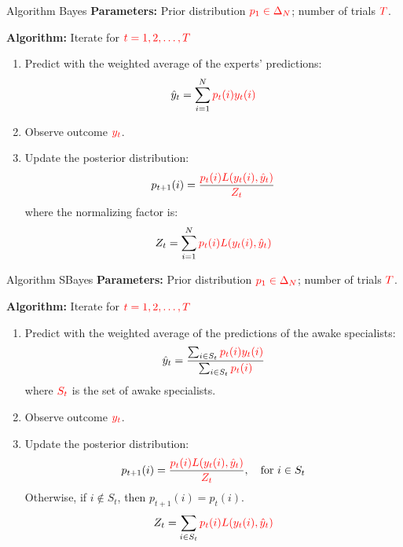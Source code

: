\documentclass{beamer}
\newcommand{\redmath}[1]{\textcolor{red}{#1}}
\begin{document}
\begin{frame}{Algorithm Bayes}
\textbf{Parameters:} Prior distribution $\redmath{p_1 \in \Delta_N}$; number of trials $\redmath{T}$.

\vspace{1em}
\textbf{Algorithm:} Iterate for $\redmath{t = 1, 2, \dots, T}$
\begin{enumerate}
    \item Predict with the weighted average of the experts' predictions:
          \[
          \hat{y}_t = \sum_{i=1}^{N} \redmath{p_t(i) y_t(i)}
          \]
    \item Observe outcome $\redmath{y_t}$.
    \item Update the posterior distribution:
          \[
          p_{t+1}(i) = \frac{\redmath{p_t(i) L(y_t(i), \hat{y}_t)}}{\redmath{Z_t}}
          \]
          where the normalizing factor is:
          \[
          Z_t = \sum_{i=1}^{N} \redmath{p_t(i) L(y_t(i), \hat{y}_t)}
          \]
\end{enumerate}
\end{frame}

\begin{frame}{Algorithm SBayes}
\textbf{Parameters:} Prior distribution $\redmath{p_1 \in \Delta_N}$; number of trials $\redmath{T}$.

\vspace{1em}
\textbf{Algorithm:} Iterate for $\redmath{t = 1, 2, \dots, T}$
\begin{enumerate}
    \item Predict with the weighted average of the predictions of the awake specialists:
          \[
          \hat{y}_t = \frac{\sum_{i \in S_t} \redmath{p_t(i) y_t(i)}}{\sum_{i \in S_t} \redmath{p_t(i)}}
          \]
          where $\redmath{S_t}$ is the set of awake specialists.
    \item Observe outcome $\redmath{y_t}$.
    \item Update the posterior distribution:
          \[
          p_{t+1}(i) = \frac{\redmath{p_t(i) L(y_t(i), \hat{y}_t)}}{\redmath{Z_t}}, \quad \text{for } i \in S_t
          \]
          Otherwise, if $i \notin S_t$, then $p_{t+1}(i) = p_t(i)$.
          \[
          Z_t = \sum_{i \in S_t} \redmath{p_t(i) L(y_t(i), \hat{y}_t)}
          \]
\end{enumerate}
\end{frame}
\end{document}
